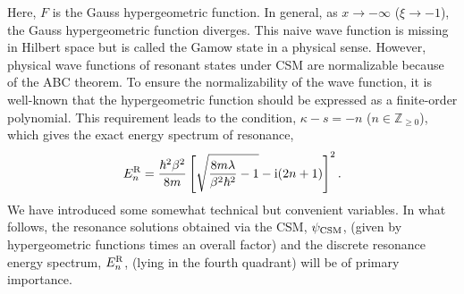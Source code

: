 Here, $F$ is the Gauss hypergeometric function.
In general, as $x\to-\infty$ ($\xi\to-1$), the Gauss hypergeometric function diverges.
This naive wave function is missing in Hilbert space but is called the Gamow state in a physical sense.
However, physical wave functions of resonant states under CSM are normalizable because of the ABC theorem.
To ensure the normalizability of the wave function, it is well-known that the hypergeometric function should be expressed as a finite-order polynomial.
This requirement leads to the condition, $\kappa-s=-n$ ($n\in\mathbb{Z}_{\geq0}$), which gives the exact energy spectrum of resonance,
\begin{align}
    E^{\mathrm{R}}_n = \frac{\hbar^2\beta^2}{8m} \left[\sqrt{\frac{8m\lambda}{\beta^2 \hbar^2} - 1} - \mathrm{i} (2n + 1) \right]^2.
\end{align}
We have introduced some somewhat technical but convenient variables. In what follows, the resonance solutions obtained via the CSM, $\psi_{\mathrm{CSM}}$, (given by hypergeometric functions times an overall factor) and the discrete resonance energy spectrum, $E^{\mathrm{R}}_n$, (lying in the fourth quadrant) will be of primary importance.
